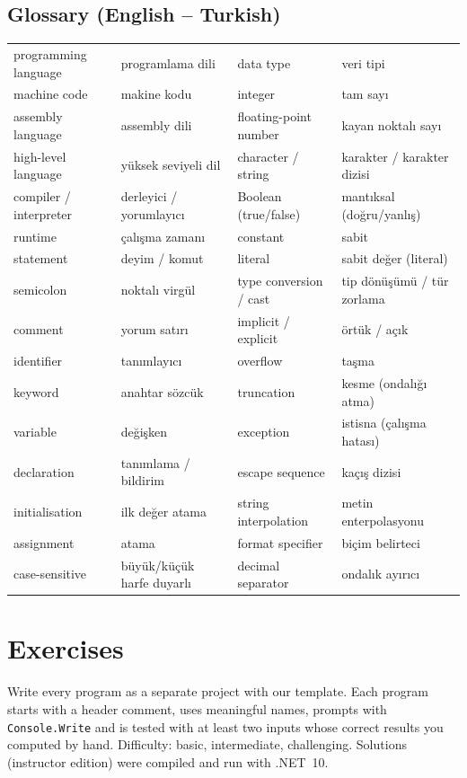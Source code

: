 \subsection*{Glossary (English -- Turkish)}
\begin{center}\footnotesize
\begin{tabular}{ll@{\hspace{5mm}}ll}
\toprule
programming language & programlama dili & data type & veri tipi\\
machine code & makine kodu & integer & tam sayı\\
assembly language & assembly dili & floating-point number & kayan noktalı sayı\\
high-level language & yüksek seviyeli dil & character / string & karakter / karakter dizisi\\
compiler / interpreter & derleyici / yorumlayıcı & Boolean (true/false) & mantıksal (doğru/yanlış)\\
runtime & çalışma zamanı & constant & sabit\\
statement & deyim / komut & literal & sabit değer (literal)\\
semicolon & noktalı virgül & type conversion / cast & tip dönüşümü / tür zorlama\\
comment & yorum satırı & implicit / explicit & örtük / açık\\
identifier & tanımlayıcı & overflow & taşma\\
keyword & anahtar sözcük & truncation & kesme (ondalığı atma)\\
variable & değişken & exception & istisna (çalışma hatası)\\
declaration & tanımlama / bildirim & escape sequence & kaçış dizisi\\
initialisation & ilk değer atama & string interpolation & metin enterpolasyonu\\
assignment & atama & format specifier & biçim belirteci\\
case-sensitive & büyük/küçük harfe duyarlı & decimal separator & ondalık ayırıcı\\ \bottomrule
\end{tabular}
\end{center}

\section{Exercises}\label{sec:exercises}
Write every program as a separate project with our template. Each program starts with a header comment, uses meaningful names, prompts with \texttt{Console.Write} and is tested with at least two inputs whose correct results you computed by hand. Difficulty:  basic,  intermediate,  challenging. Solutions (instructor edition) were compiled and run with .NET~10.

